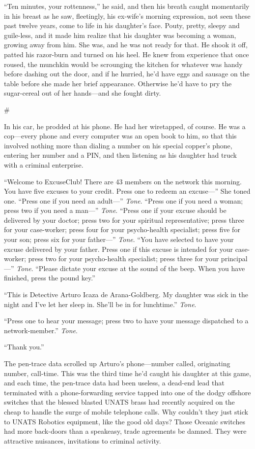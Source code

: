 “Ten minutes, your rottenness,” he said, and then his breath caught
momentarily in his breast as he saw, fleetingly, his ex-wife’s
morning expression, not seen these past twelve years, come to life
in his daughter’s face. Pouty, pretty, sleepy and guile-less, and
it made him realize that his daughter was becoming a woman, growing
away from him. She was, and he was not ready for that. He shook it
off, patted his razor-burn and turned on his heel. He knew from
experience that once roused, the munchkin would be scrounging the
kitchen for whatever was handy before dashing out the door, and if
he hurried, he’d have eggs and sausage on the table before she made
her brief appearance. Otherwise he’d have to pry the sugar-cereal
out of her hands—and she fought dirty.

\#

In his car, he prodded at his phone. He had her wiretapped, of
course. He was a cop—every phone and every computer was an open
book to him, so that this involved nothing more than dialing a
number on his special copper’s phone, entering her number and a
PIN, and then listening as his daughter had truck with a criminal
enterprise.

“Welcome to ExcuseClub! There are 43 members on the network this
morning. You have five excuses to your credit. Press one to redeem
an excuse—” She toned one. “Press one if you need an adult—”
\emph{Tone}. “Press one if you need a woman; press two if you need
a man—” \emph{Tone}. “Press one if your excuse should be delivered
by your doctor; press two for your spiritual representative; press
three for your case-worker; press four for your psycho-health
specialist; press five for your son; press six for your father—”
\emph{Tone}. “You have selected to have your excuse delivered by
your father. Press one if this excuse is intended for your
case-worker; press two for your psycho-health specialist; press
three for your principal—” \emph{Tone}. “Please dictate your excuse
at the sound of the beep. When you have finished, press the pound
key.”

“This is Detective Arturo Icaza de Arana-Goldberg. My daughter was
sick in the night and I’ve let her sleep in. She’ll be in for
lunchtime.” \emph{Tone}.

“Press one to hear your message; press two to have your message
dispatched to a network-member.” \emph{Tone}.

“Thank you.”

The pen-trace data scrolled up Arturo’s phone—number called,
originating number, call-time. This was the third time he’d caught
his daughter at this game, and each time, the pen-trace data had
been useless, a dead-end lead that terminated with a
phone-forwarding service tapped into one of the dodgy offshore
switches that the blessed blasted UNATS brass had recently acquired
on the cheap to handle the surge of mobile telephone calls. Why
couldn’t they just stick to UNATS Robotics equipment, like the good
old days? Those Oceanic switches had more back-doors than a
speakeasy, trade agreements be damned. They were attractive
nuisances, invitations to criminal activity.

